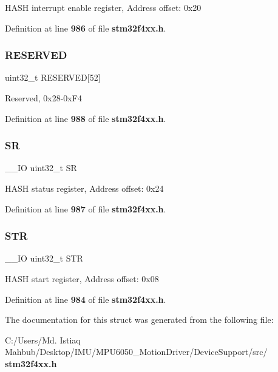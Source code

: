 H\+A\+SH interrupt enable register, Address offset\+: 0x20 

Definition at line \textbf{ 986} of file \textbf{ stm32f4xx.\+h}.

\mbox{\label{structHASH__TypeDef_a31675cbea6dc1b5f7de162884a4bb6eb}} 
\subsubsection{R\+E\+S\+E\+R\+V\+ED}
{\footnotesize\ttfamily uint32\+\_\+t R\+E\+S\+E\+R\+V\+ED[52]}

Reserved, 0x28-\/0x\+F4 

Definition at line \textbf{ 988} of file \textbf{ stm32f4xx.\+h}.

\mbox{\label{structHASH__TypeDef_af6aca2bbd40c0fb6df7c3aebe224a360}} 
\subsubsection{SR}
{\footnotesize\ttfamily \+\_\+\+\_\+\+IO uint32\+\_\+t SR}

H\+A\+SH status register, Address offset\+: 0x24 

Definition at line \textbf{ 987} of file \textbf{ stm32f4xx.\+h}.

\mbox{\label{structHASH__TypeDef_a7060ac1ed928ee931d7664650f2dcf75}} 
\subsubsection{S\+TR}
{\footnotesize\ttfamily \+\_\+\+\_\+\+IO uint32\+\_\+t S\+TR}

H\+A\+SH start register, Address offset\+: 0x08 

Definition at line \textbf{ 984} of file \textbf{ stm32f4xx.\+h}.



The documentation for this struct was generated from the following file\+:\begin{DoxyCompactItemize}
\item 
C\+:/\+Users/\+Md. Istiaq Mahbub/\+Desktop/\+I\+M\+U/\+M\+P\+U6050\+\_\+\+Motion\+Driver/\+Device\+Support/src/\textbf{ stm32f4xx.\+h}\end{DoxyCompactItemize}
